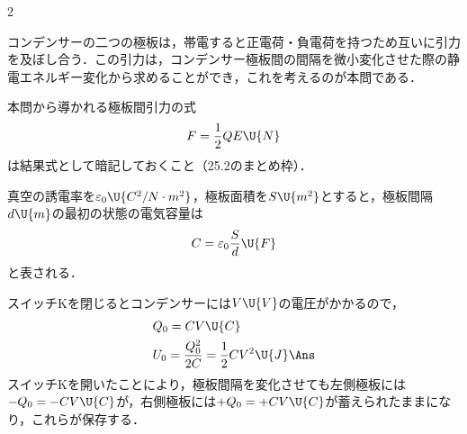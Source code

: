 \begin{multicols}{2}
\par\nopagebreak
\begin{sisin}
コンデンサーの二つの極板は，帯電すると正電荷・負電荷を持つため互いに引力を及ぼし合う．この引力は，コンデンサー極板間の間隔を微小変化させた際の静電エネルギー変化から求めることができ，これを考えるのが本問である．

本問から導かれる極板間引力の式
\[F=\frac{1}{2}QE\U{N}\]
は結果式として暗記しておくこと（25.2のまとめ枠）．
\end{sisin}
\KaiHead
真空の誘電率を$\varepsilon_0\U{C^2/N\cdot m^2}$，極板面積を$S\U{m^2}$とすると，極板間隔$d\U{m}$の最初の状態の電気容量は
\[C=\varepsilon_0\frac{S}{d}\U{F}\]
と表される．
\begin{komon}
 スイッチ$\mathrm{K}$を閉じるとコンデンサーには$V\U{V}$の電圧がかかるので，
       \[\begin{aligned}
         &Q_0=CV\U{C}\\
         &U_0=\frac{Q_0^2}{2C}=\frac{1}{2}CV^2\U{J}\Ans
       \end{aligned}\]
 スイッチ$\mathrm{K}$を開いたことにより，極板間隔を変化させても左側極板には$-Q_0=-CV\U{C}$が，右側極板には$+Q_0=+CV\U{C}$が蓄えられたままになり，これらが保存する．


\end{komon}
\end{multicols}
